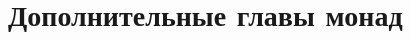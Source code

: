 \documentclass[12pt]{article}
\begin{document}



%
%
%
%
%
%
%
%
%
%


    \section{Дополнительные главы монад}











\end{document}
